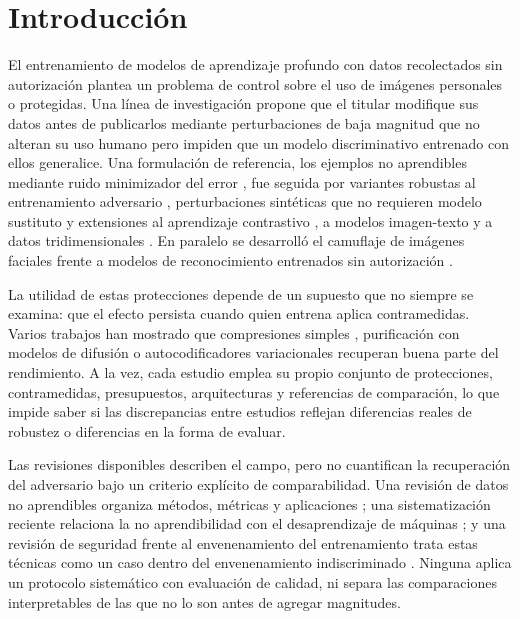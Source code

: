 \documentclass[pdflatex,sn-mathphys-num]{sn-jnl}
\theoremstyle{thmstyleone}
\theoremstyle{thmstyletwo}
\theoremstyle{thmstylethree}
\begin{document}

\maketitle

\section{Introducción}\label{sec:intro}

El entrenamiento de modelos de aprendizaje profundo con datos recolectados sin autorización plantea un problema de control sobre el uso de imágenes personales o protegidas. Una línea de investigación propone que el titular modifique sus datos antes de publicarlos mediante perturbaciones de baja magnitud que no alteran su uso humano pero impiden que un modelo discriminativo entrenado con ellos generalice. Una formulación de referencia, los ejemplos no aprendibles mediante ruido minimizador del error \cite{S0014}, fue seguida por variantes robustas al entrenamiento adversario \cite{S0075,S0040}, perturbaciones sintéticas que no requieren modelo sustituto \cite{S0063,S0068,S0137} y extensiones al aprendizaje contrastivo \cite{S0112}, a modelos imagen-texto \cite{S0124} y a datos tridimensionales \cite{S0148,S0082}. En paralelo se desarrolló el camuflaje de imágenes faciales frente a modelos de reconocimiento entrenados sin autorización \cite{S0060}.

La utilidad de estas protecciones depende de un supuesto que no siempre se examina: que el efecto persista cuando quien entrena aplica contramedidas. Varios trabajos han mostrado que compresiones simples \cite{S0105}, purificación con modelos de difusión \cite{S0145,S0094} o autocodificadores variacionales \cite{S0093} recuperan buena parte del rendimiento. A la vez, cada estudio emplea su propio conjunto de protecciones, contramedidas, presupuestos, arquitecturas y referencias de comparación, lo que impide saber si las discrepancias entre estudios reflejan diferencias reales de robustez o diferencias en la forma de evaluar.

Las revisiones disponibles describen el campo, pero no cuantifican la recuperación del adversario bajo un criterio explícito de comparabilidad. Una revisión de datos no aprendibles organiza métodos, métricas y aplicaciones \cite{li2025survey}; una sistematización reciente relaciona la no aprendibilidad con el desaprendizaje de máquinas \cite{zhang2026sok}; y una revisión de seguridad frente al envenenamiento del entrenamiento trata estas técnicas como un caso dentro del envenenamiento indiscriminado \cite{cina2023wild}. Ninguna aplica un protocolo sistemático con evaluación de calidad, ni separa las comparaciones interpretables de las que no lo son antes de agregar magnitudes.
\end{document}
